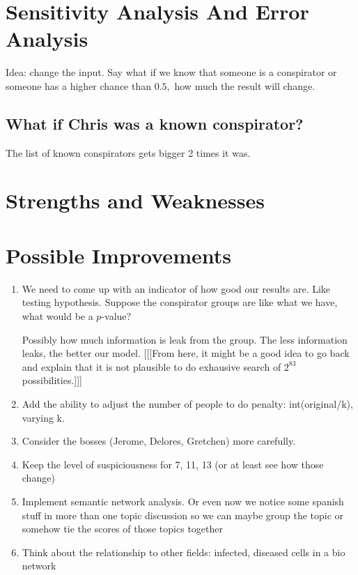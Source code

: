 \documentclass{icmmcm}
\begin{document}

\section{Sensitivity Analysis And Error Analysis}
Idea: change the input. Say what if we know that someone is a conspirator
or someone has a higher chance than $0.5,$
how much the result will change.

\subsection{What if Chris was a known conspirator?}
The list of known conspirators gets bigger 2 times it was. 

\section{Strengths and Weaknesses}

\section{Possible Improvements}
\begin{enumerate}
\item We need to come up with an indicator of how good our results are.
Like testing hypothesis. Suppose the conspirator groups are 
like what we have, what would be a $p$-value?

Possibly how much information is leak from the group.
The less information leaks, the better our model.
 [[[From here, it might be a good idea to go back
and explain that it is not plausible to do exhausive search of
$2^{83}$ possibilities.]]]
\item Add the ability to adjust the number of people to do penalty: int(original/k), varying k.
\item Consider the bosses (Jerome, Delores, Gretchen) more carefully.
\item Keep the level of suspiciousness for 7, 11, 13 (or at least see how those change)
\item Implement semantic network analysis. 
	Or even now we notice some spanish stuff in more than one topic discussion
	so we can maybe group the topic or somehow tie the scores of those topics together
\item Think about the relationship to other fields: infected, diseased cells in a bio network
\end{enumerate}
		
\end{document}
